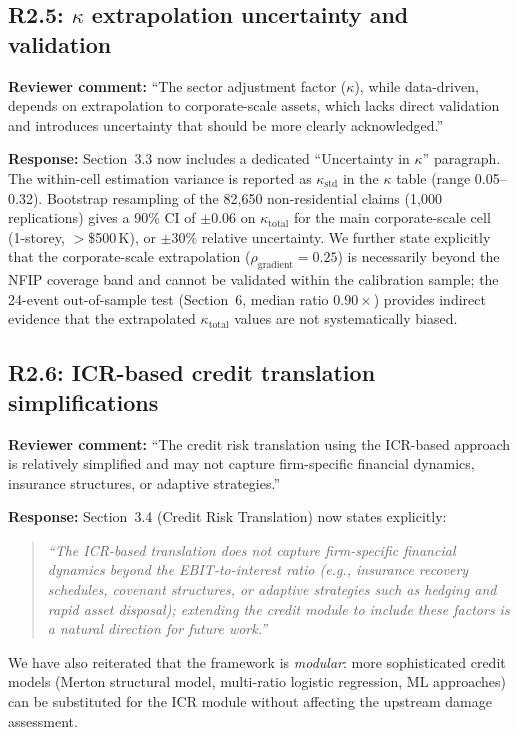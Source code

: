 \documentclass[11pt]{article}
\begin{document}
\subsection*{R2.5: $\kappa$ extrapolation uncertainty and validation}

\textbf{Reviewer comment:} ``The sector adjustment factor ($\kappa$), while data-driven, depends on extrapolation to corporate-scale assets, which lacks direct validation and introduces uncertainty that should be more clearly acknowledged.''

\textbf{Response:} Section~3.3 now includes a dedicated ``Uncertainty in $\kappa$'' paragraph. The within-cell estimation variance is reported as $\kappa_{\text{std}}$ in the $\kappa$ table (range 0.05--0.32). Bootstrap resampling of the 82{,}650 non-residential claims (1{,}000 replications) gives a 90\% CI of $\pm 0.06$ on $\kappa_{\text{total}}$ for the main corporate-scale cell (1-storey, $>$\$500\,K), or $\pm 30\%$ relative uncertainty. We further state explicitly that the corporate-scale extrapolation ($\rho_{\text{gradient}} = 0.25$) is necessarily beyond the NFIP coverage band and cannot be validated within the calibration sample; the 24-event out-of-sample test (Section~6, median ratio $0.90\times$) provides indirect evidence that the extrapolated $\kappa_{\text{total}}$ values are not systematically biased.

\subsection*{R2.6: ICR-based credit translation simplifications}

\textbf{Reviewer comment:} ``The credit risk translation using the ICR-based approach is relatively simplified and may not capture firm-specific financial dynamics, insurance structures, or adaptive strategies.''

\textbf{Response:} Section~3.4 (Credit Risk Translation) now states explicitly:
\begin{quote}
\textit{``The ICR-based translation does not capture firm-specific financial dynamics beyond the EBIT-to-interest ratio (e.g., insurance recovery schedules, covenant structures, or adaptive strategies such as hedging and rapid asset disposal); extending the credit module to include these factors is a natural direction for future work.''}
\end{quote}
We have also reiterated that the framework is \textit{modular}: more sophisticated credit models (Merton structural model, multi-ratio logistic regression, ML approaches) can be substituted for the ICR module without affecting the upstream damage assessment.
\end{document}

